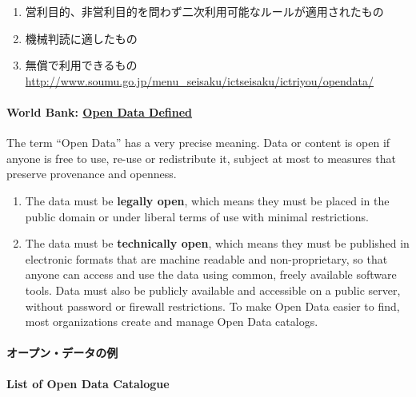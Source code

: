 \documentclass[
]{bxjsbook}
\providecommand{\tightlist}{%
  \setlength{\itemsep}{0pt}\setlength{\parskip}{0pt}}
\theoremstyle{definition}
\theoremstyle{definition}
\theoremstyle{definition}
\theoremstyle{definition}
\theoremstyle{remark}
\begin{document}
\begin{enumerate}
\def\labelenumi{\arabic{enumi}.}
\tightlist
\item
  営利目的、非営利目的を問わず二次利用可能なルールが適用されたもの
\item
  機械判読に適したもの
\item
  無償で利用できるもの
  \url{http://www.soumu.go.jp/menu_seisaku/ictseisaku/ictriyou/opendata/}
\end{enumerate}

\hypertarget{world-bank-open-data-defined}{%
\paragraph{\texorpdfstring{World Bank: \href{http://opendatatoolkit.worldbank.org}{Open Data Defined}}{World Bank: Open Data Defined}}\label{world-bank-open-data-defined}}

The term ``Open Data'' has a very precise meaning. Data or content is open if anyone is free to use, re-use or redistribute it, subject at most to measures that preserve provenance and openness.

\begin{enumerate}
\def\labelenumi{\arabic{enumi}.}
\item
  The data must be \textbf{legally open}, which means they must be placed in the public domain or under liberal terms of use with minimal restrictions.
\item
  The data must be \textbf{technically open}, which means they must be published in electronic formats that are machine readable and non-proprietary, so that anyone can access and use the data using common, freely available software tools. Data must also be publicly available and accessible on a public server, without password or firewall restrictions. To make Open Data easier to find, most organizations create and manage Open Data catalogs.
\end{enumerate}

\hypertarget{ux30aaux30fcux30d7ux30f3ux30c7ux30fcux30bfux306eux4f8b}{%
\paragraph{オープン・データの例}\label{ux30aaux30fcux30d7ux30f3ux30c7ux30fcux30bfux306eux4f8b}}

\textbf{List of Open Data Catalogue}
\end{document}
